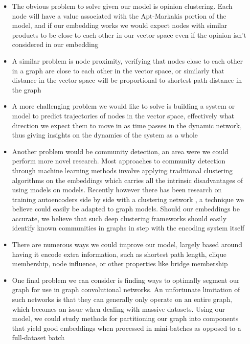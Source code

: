 \documentclass[10pt]{article}
\begin{document}
\begin{itemize}
\item The obvious problem to solve given our model is opinion clustering. Each node will have a value associated with the Apt-Markakis portion of the model, and if our embedding works we would expect nodes with similar products to be close to each other in our vector space even if the opinion isn't considered in our embedding
\item A similar problem is node proximity, verifying that nodes close to each other in a graph are close to each other in the vector space, or similarly that distance in the vector space will be proportional to shortest path distance in the graph
\item A more challenging problem we would like to solve is building a system or model to predict trajectories of nodes in the vector space, effectively what direction we expect them to move in as time passes in the dynamic network, thus giving insights on the dynamics of the system as a whole
\item Another problem would be community detection, an area were we could perform more novel research. Most approaches to community detection through machine learning methods involve applying traditional clustering algorithms on the embeddings which carries all the intrinsic disadvantages of using models on models. Recently however there has been research on training autoencoders side by side with a clustering network \cite{xie2016unsupervised, zhang2019deep}, a technique we believe could easily be adapted to graph models. Should our embeddings be accurate, we believe that such deep clustering frameworks should easily identify known communities in graphs in step with the encoding system itself
\item There are numerous ways we could improve our model, largely based around having it encode extra information, such as shortest path length, clique membership, node influence, or other properties like bridge membership
\item One final problem we can consider is finding ways to optimally segment our graph for use in graph convolutional networks. An unfortunate limitation of such networks is that they can generally only operate on an entire graph, which becomes an issue when dealing with massive datasets. Using our model, we could study methods for partitioning our graph into components that yield good embeddings when processed in mini-batches as opposed to a full-dataset batch \\
\end{itemize}
\end{document}
